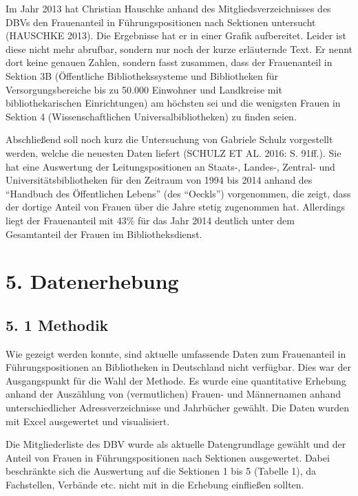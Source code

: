\documentclass[a4paper,
fontsize=11pt,
oneside,
numbers=noperiodatend,
parskip=half-,
bibliography=totoc,
final
]{scrartcl}
\begin{document}
Im Jahr 2013 hat Christian Hauschke anhand des Mitgliedsverzeichnisses
des DBVs den Frauenanteil in Führungspositionen nach Sektionen
untersucht (HAUSCHKE 2013). Die Ergebnisse hat er in einer Grafik
aufbereitet. Leider ist diese nicht mehr abrufbar, sondern nur noch der
kurze erläuternde Text. Er nennt dort keine genauen Zahlen, sondern
fasst zusammen, dass der Frauenanteil in Sektion 3B (Öffentliche
Bibliothekssysteme und Bibliotheken für Versorgungsbereiche bis zu
50.000 Einwohner und Landkreise mit bibliothekarischen Einrichtungen) am
höchsten sei und die wenigsten Frauen in Sektion 4 (Wissenschaftlichen
Universalbibliotheken) zu finden seien.

Abschließend soll noch kurz die Untersuchung von Gabriele Schulz
vorgestellt werden, welche die neuesten Daten liefert (SCHULZ ET AL.
2016: S. 91ff.). Sie hat eine Auswertung der Leitungspositionen an
Staats-, Landes-, Zentral- und Universitätsbibliotheken für den Zeitraum
von 1994 bis 2014 anhand des \enquote{Handbuch des Öffentlichen Lebens}
(des \enquote{Oeckls}) vorgenommen, die zeigt, dass der dortige Anteil
von Frauen über die Jahre stetig zugenommen hat. Allerdings liegt der
Frauenanteil mit 43\% für das Jahr 2014 deutlich unter dem Gesamtanteil
der Frauen im Bibliotheksdienst.

\hypertarget{datenerhebung}{%
\section{5. Datenerhebung}\label{datenerhebung}}

\hypertarget{methodik}{%
\subsection{5. 1 Methodik}\label{methodik}}

Wie gezeigt werden konnte, sind aktuelle umfassende Daten zum
Frauenanteil in Führungspositionen an Bibliotheken in Deutschland nicht
verfügbar. Dies war der Ausgangspunkt für die Wahl der Methode. Es wurde
eine quantitative Erhebung anhand der Auszählung von (vermutlichen)
Frauen- und Männernamen anhand unterschiedlicher Adressverzeichnisse und
Jahrbücher gewählt. Die Daten wurden mit Excel ausgewertet und
visualisiert.

Die Mitgliederliste des DBV wurde als aktuelle Datengrundlage gewählt
und der Anteil von Frauen in Führungspositionen nach Sektionen
ausgewertet. Dabei beschränkte sich die Auswertung auf die Sektionen 1
bis 5 (Tabelle 1), da Fachstellen, Verbände etc. nicht mit in die
Erhebung einfließen sollten.
\end{document}
